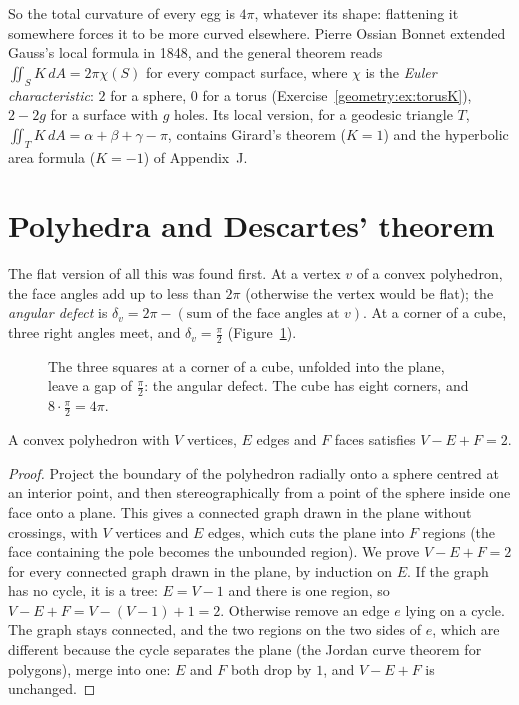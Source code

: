 So the total curvature of every egg is $4\pi$, whatever its shape: flattening it somewhere forces it to be more curved elsewhere. Pierre Ossian Bonnet extended Gauss's
local formula in 1848, and the general theorem reads $\iint_SK\,dA=2\pi\chi(S)$ for every compact surface, where $\chi$ is the \emph{Euler characteristic}: $2$ for a sphere,
$0$ for a torus (Exercise~\ref{geometry:ex:torusK}), $2-2g$ for a surface with $g$ holes. Its local version, for a geodesic triangle $T$,
$\iint_TK\,dA=\alpha+\beta+\gamma-\pi$, contains Girard's theorem ($K=1$) and the hyperbolic area formula ($K=-1$) of Appendix~J.

\section{Polyhedra and Descartes' theorem}

The flat version of all this was found first. At a vertex $v$ of a convex polyhedron, the face angles add up to less than $2\pi$ (otherwise the vertex would be
flat); the \emph{angular defect} is $\delta_v=2\pi-(\text{sum of the face angles at }v)$. At a corner of a cube, three right angles meet, and $\delta_v=\frac\pi2$
(Figure~\ref{geometry:fig:defect}).

\begin{figure}[ht]
\centering
{}
\caption{The three squares at a corner of a cube, unfolded into the plane, leave a gap of $\frac\pi2$: the angular defect. The cube has eight corners, and
$8\cdot\frac\pi2=4\pi$.}
\label{geometry:fig:defect}
\end{figure}

\begin{theorem}[Euler, 1758]\label{geometry:thm:euler}
A convex polyhedron with $V$ vertices, $E$ edges and $F$ faces satisfies $V-E+F=2$.
\end{theorem}

\begin{proof}
Project the boundary of the polyhedron radially onto a sphere centred at an interior point, and then stereographically from a point of the sphere inside one face
onto a plane. This gives a connected graph drawn in the plane without crossings, with $V$ vertices and $E$ edges, which cuts the plane into $F$ regions (the face
containing the pole becomes the unbounded region). We prove $V-E+F=2$ for every connected graph drawn in the plane, by induction on $E$. If the graph has no
cycle, it is a tree: $E=V-1$ and there is one region, so $V-E+F=V-(V-1)+1=2$. Otherwise remove an edge $e$ lying on a cycle. The graph stays connected, and the two
regions on the two sides of $e$, which are different because the cycle separates the plane (the Jordan curve theorem for polygons), merge into one: $E$ and $F$
both drop by $1$, and $V-E+F$ is unchanged.
\end{proof}

